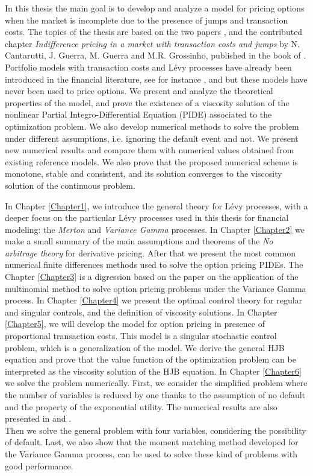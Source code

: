 In this thesis the main goal is to develop and analyze a model for pricing options when the market is incomplete due to the presence of jumps and transaction costs. 
The topics of the thesis are based on the two papers 
\cite{Canta2}, \cite{Canta} and the contributed chapter \emph{Indifference pricing in a market with transaction costs and jumps} by N. Cantarutti, J. Guerra, M. Guerra and 
M.R. Grossinho, published in the book of \cite{Matthias}.\\
Portfolio models with transaction costs and Lévy processes have already been introduced in the financial literature, see for instance \cite{OkSu01}, \cite{BKR01} and \cite{Kab16} 
but these models have never been used to price options.  
We present and analyze the theoretical properties of the model, and prove the existence of a viscosity solution 
of the nonlinear
Partial Integro-Differential Equation (PIDE) associated to the optimization problem. We also develop numerical methods to solve the problem under different assumptions, i.e. ignoring the 
default event and not.
We present new numerical results and compare them with numerical values obtained from existing reference models. We also prove that 
the proposed numerical scheme is monotone, stable and consistent, and its solution converges to the viscosity solution of the continuous problem.

In Chapter \ref{Chapter1}, we introduce the general theory for Lévy processes, with a deeper focus on the particular Lévy processes used in this thesis for financial modeling:  
the \emph{Merton} and \emph{Variance Gamma} processes.   
In Chapter \ref{Chapter2} we make a small summary of the main assumptions and theorems of the \emph{No arbitrage theory} for derivative pricing. After that we present 
the most common numerical finite differences methods used to solve the option pricing PIDEs. 
The Chapter \ref{Chapter3} is a digression based on the paper \cite{Canta2} on the application of the multinomial method to solve option pricing problems under the Variance Gamma process. 
In Chapter \ref{Chapter4} we present the optimal control theory for regular and singular controls, and the definition of viscosity solutions. 
In Chapter \ref{Chapter5}, we will develop the model for option pricing in presence of proportional transaction costs. This model is a singular stochastic
control problem, which is a generalization of the \cite{DaPaZa93} model. We derive the general HJB equation and prove that the value function of the optimization problem 
can be interpreted as the viscosity solution of the HJB equation.  
In Chapter \ref{Chapter6} we solve the problem numerically. 
First, we consider the simplified problem where the number of variables is reduced by one thanks to the assumption of no default and the property of the exponential utility. 
The numerical results are also presented in \cite{Canta} and \cite{Matthias}.\\
Then we solve the general problem with four variables, considering the possibility of default. Last, we also show that the moment matching method developed for 
the Variance Gamma process, can be used to solve these kind of problems with good performance. 

